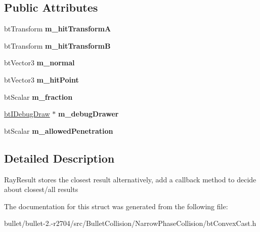 \subsection*{Public Attributes}
\begin{DoxyCompactItemize}
\item 
\hypertarget{structbt_convex_cast_1_1_cast_result_a5bc7b0d3dcded6583c57ced03e08dffb}{bt\+Transform {\bfseries m\+\_\+hit\+Transform\+A}}\label{structbt_convex_cast_1_1_cast_result_a5bc7b0d3dcded6583c57ced03e08dffb}

\item 
\hypertarget{structbt_convex_cast_1_1_cast_result_acb5af7677af5f71ae38002c7b08d5f88}{bt\+Transform {\bfseries m\+\_\+hit\+Transform\+B}}\label{structbt_convex_cast_1_1_cast_result_acb5af7677af5f71ae38002c7b08d5f88}

\item 
\hypertarget{structbt_convex_cast_1_1_cast_result_a148656b35ce0209617a5f65d60260e5b}{bt\+Vector3 {\bfseries m\+\_\+normal}}\label{structbt_convex_cast_1_1_cast_result_a148656b35ce0209617a5f65d60260e5b}

\item 
\hypertarget{structbt_convex_cast_1_1_cast_result_acb26f2da1eff229db573667b6a415aab}{bt\+Vector3 {\bfseries m\+\_\+hit\+Point}}\label{structbt_convex_cast_1_1_cast_result_acb26f2da1eff229db573667b6a415aab}

\item 
\hypertarget{structbt_convex_cast_1_1_cast_result_a4685e4b6ea1dd8acc76738986555874a}{bt\+Scalar {\bfseries m\+\_\+fraction}}\label{structbt_convex_cast_1_1_cast_result_a4685e4b6ea1dd8acc76738986555874a}

\item 
\hypertarget{structbt_convex_cast_1_1_cast_result_a41adc51c703a41aed9ee3bae7c57dcff}{\hyperlink{classbt_i_debug_draw}{bt\+I\+Debug\+Draw} $\ast$ {\bfseries m\+\_\+debug\+Drawer}}\label{structbt_convex_cast_1_1_cast_result_a41adc51c703a41aed9ee3bae7c57dcff}

\item 
\hypertarget{structbt_convex_cast_1_1_cast_result_abb06d78a6878f231ab30a4e112d16781}{bt\+Scalar {\bfseries m\+\_\+allowed\+Penetration}}\label{structbt_convex_cast_1_1_cast_result_abb06d78a6878f231ab30a4e112d16781}

\end{DoxyCompactItemize}


\subsection{Detailed Description}
Ray\+Result stores the closest result alternatively, add a callback method to decide about closest/all results 

The documentation for this struct was generated from the following file\+:\begin{DoxyCompactItemize}
\item 
bullet/bullet-\/2.-\/r2704/src/\+Bullet\+Collision/\+Narrow\+Phase\+Collision/bt\+Convex\+Cast.\+h\end{DoxyCompactItemize}
